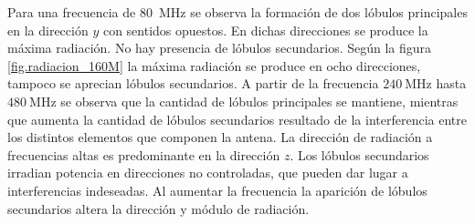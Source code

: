 Para una frecuencia de \SI{80}{\mega\hertz} se observa la formación de dos lóbulos principales en la dirección $y$ con sentidos opuestos. En dichas direcciones se produce la máxima radiación. No hay presencia de lóbulos secundarios.
Según la figura \ref{fig.radiacion_160M} la máxima radiación se produce en ocho direcciones, tampoco se aprecian lóbulos secundarios.
A partir de la frecuencia $\SI{240}{\mega\hertz}$ hasta $\SI{480}{\mega\hertz}$ se observa que la cantidad de lóbulos principales se mantiene, mientras que aumenta la cantidad de lóbulos secundarios resultado de la interferencia entre los distintos elementos que componen la antena. La dirección de radiación a frecuencias altas es predominante en la dirección $z$. Los lóbulos secundarios irradian potencia en direcciones no controladas, que pueden dar lugar a interferencias indeseadas. Al aumentar la frecuencia la aparición de lóbulos secundarios altera la dirección y módulo de radiación. 



